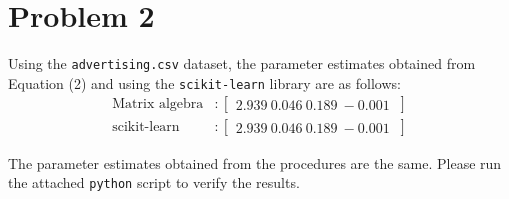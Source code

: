 \documentclass{article}[12pt]
\begin{document}
\section{Problem 2}
Using the \texttt{advertising.csv} dataset,
the parameter estimates obtained from Equation (2)
and using the \texttt{scikit-learn} library are as follows:
\begin{align*}
    \text{Matrix algebra} & : \begin{bmatrix} 2.939 \ 0.046 \ 0.189 \ -0.001 \ \end{bmatrix} \\
    \text{scikit-learn}   & : \begin{bmatrix} 2.939 \ 0.046 \ 0.189 \ -0.001 \ \end{bmatrix}
\end{align*}

The parameter estimates obtained from the procedures are the same.
Please run the attached \texttt{python} script to verify the results.
\end{document}
